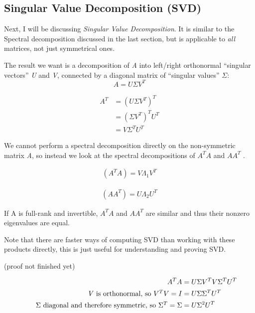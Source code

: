 \documentclass[12pt]{article}
\theoremstyle{definition}
\begin{document}
\subsection{Singular Value Decomposition (SVD)}

Next, I will be discussing \textit{Singular Value Decomposition}. 
It is similar to the Spectral decomposition  discussed in the last section, but is applicable to \textit{all} matrices, not just symmetrical ones.

The result we want is a decomposition of \textit{A} into left/right orthonormal ``singular vectors'' \textit{U} and \textit{V}, connected by a diagonal matrix of ``singular values'' $\Sigma$:
\begin{equation}
	A = U \Sigma V^T
	\label{eq:SVD}
\end{equation}


\begin{align*}
	A^T &= (U \Sigma V^T)^T \\
	&= (\Sigma V^T)^T U^T \\
	&= V \Sigma^T U^T 
\end{align*}

We cannot perform a spectral decomposition directly on the non-symmetric matrix \textit{A}, so instead we look at the spectral decompositions of $A^T A$ and $A A^T$ .

\begin{align*}
	(A^T A ) = V \Lambda_1 V^T
\end{align*}

\begin{align*}
	(A A^T) = U \Lambda_2 U^T
\end{align*}

If A is full-rank and invertible, $A^T A$ and $A A^T$ are similar and thus their nonzero eigenvalues are equal.




Note that there are faster ways of computing SVD than working with these products directly, this is just useful for understanding and proving SVD.

(proof not finished yet)



\begin{align*}
	A^T A &= U \Sigma V^T V \Sigma^T U^T  \\
	\tag*{\textit{V} is orthonormal, so $V^T V = I$}
	&= U \Sigma \Sigma^T U^T  \\
	\tag*{$\Sigma$ diagonal and therefore symmetric, so $\Sigma^T = \Sigma$}
	&= U \Sigma^2 U^T 
\end{align*}
\end{document}
